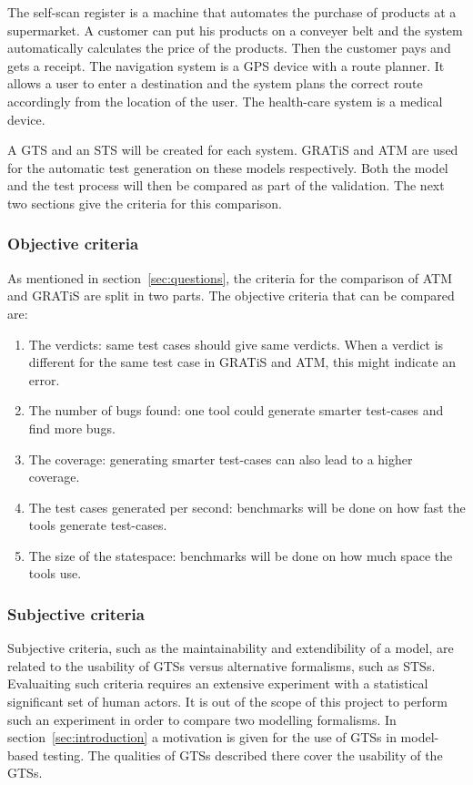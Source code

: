 The self-scan register is a machine that automates the purchase of products at a supermarket. A customer can put his products on a conveyer belt and the system automatically calculates the price of the products. Then the customer pays and gets a receipt. The navigation system is a GPS device with a route planner. It allows a user to enter a destination and the system plans the correct route accordingly from the location of the user. The health-care system is a medical device.

A GTS and an STS will be created for each system. GRATiS and ATM are used for the automatic test generation on these models respectively. Both the model and the test process will then be compared as part of the validation. The next two sections give the criteria for this comparison.

\subsubsection{Objective criteria}
As mentioned in section~\ref{sec:questions}, the criteria for the comparison of ATM and GRATiS are split in two parts. The objective criteria that can be compared are:
\begin{enumerate}
  \item The verdicts: same test cases should give same verdicts. When a verdict is different for the same test case in GRATiS and ATM, this might indicate an error.
  \item The number of bugs found: one tool could generate smarter test-cases and find more bugs.
  \item The coverage: generating smarter test-cases can also lead to a higher coverage.
  \item The test cases generated per second: benchmarks will be done on how fast the tools generate test-cases.
  \item The size of the statespace: benchmarks will be done on how much space the tools use.
\end{enumerate}

\subsubsection{Subjective criteria}
Subjective criteria, such as the maintainability and extendibility of a model, are related to the usability of GTSs versus alternative formalisms, such as STSs. Evaluaiting such criteria requires an extensive experiment with a statistical significant set of human actors. It is out of the scope of this project to perform such an experiment in order to compare two modelling formalisms. In section~\ref{sec:introduction} a motivation is given for the use of GTSs in model-based testing. The qualities of GTSs described there cover the usability of the GTSs.
